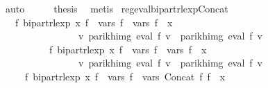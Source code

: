 \begin{isabellebody}
\ auto\isanewline
\ \ \isamarkupfalse%
\ \isamarkupfalse%
\ {\isacharquery}{\kern0pt}thesis\ \isamarkupfalse%
\ metis\isanewline
{}\isamarkupfalse%
%
\endisatagproof
{\isafoldproof}%
%
\isadelimproof
\isanewline
%
\endisadelimproof
\isanewline
{}\isamarkupfalse%
\ reg{\isacharunderscore}{\kern0pt}eval{\isacharunderscore}{\kern0pt}bipart{\isacharunderscore}{\kern0pt}rlexp{\isacharunderscore}{\kern0pt}Concat{\isacharcolon}{\kern0pt}\isanewline
\ \ \ {\isachardoublequoteopen}{\isasymexists}f{\isacharprime}{\kern0pt}{\isachardot}{\kern0pt}\ bipart{\isacharunderscore}{\kern0pt}rlexp\ x\ f{\isacharprime}{\kern0pt}\ {\isasymand}\ vars\ f{\isacharprime}{\kern0pt}\ {\isacharequal}{\kern0pt}\ vars\ f{}\ {\isasymunion}\ {\isacharbraceleft}{\kern0pt}x{\isacharbraceright}{\kern0pt}\ {\isasymand}\isanewline
\ \ \ \ \ \ \ \ \ \ \ \ \ \ \ \ {\isacharparenleft}{\kern0pt}{\isasymforall}v{\isachardot}{\kern0pt}\ parikh{\isacharunderscore}{\kern0pt}img\ {\isacharparenleft}{\kern0pt}eval\ f{}\ v{\isacharparenright}{\kern0pt}\ {\isacharequal}{\kern0pt}\ parikh{\isacharunderscore}{\kern0pt}img\ {\isacharparenleft}{\kern0pt}eval\ f{\isacharprime}{\kern0pt}\ v{\isacharparenright}{\kern0pt}{\isacharparenright}{\kern0pt}{\isachardoublequoteclose}\isanewline
\ \ \ \ \ \ \ \ \ \ {\isachardoublequoteopen}{\isasymexists}f{\isacharprime}{\kern0pt}{\isachardot}{\kern0pt}\ bipart{\isacharunderscore}{\kern0pt}rlexp\ x\ f{\isacharprime}{\kern0pt}\ {\isasymand}\ vars\ f{\isacharprime}{\kern0pt}\ {\isacharequal}{\kern0pt}\ vars\ f{}\ {\isasymunion}\ {\isacharbraceleft}{\kern0pt}x{\isacharbraceright}{\kern0pt}\ {\isasymand}\isanewline
\ \ \ \ \ \ \ \ \ \ \ \ \ \ \ \ {\isacharparenleft}{\kern0pt}{\isasymforall}v{\isachardot}{\kern0pt}\ parikh{\isacharunderscore}{\kern0pt}img\ {\isacharparenleft}{\kern0pt}eval\ f{}\ v{\isacharparenright}{\kern0pt}\ {\isacharequal}{\kern0pt}\ parikh{\isacharunderscore}{\kern0pt}img\ {\isacharparenleft}{\kern0pt}eval\ f{\isacharprime}{\kern0pt}\ v{\isacharparenright}{\kern0pt}{\isacharparenright}{\kern0pt}{\isachardoublequoteclose}\isanewline
\ \ \ \ \ {\isachardoublequoteopen}{\isasymexists}f{\isacharprime}{\kern0pt}{\isachardot}{\kern0pt}\ bipart{\isacharunderscore}{\kern0pt}rlexp\ x\ f{\isacharprime}{\kern0pt}\ {\isasymand}\ vars\ f{\isacharprime}{\kern0pt}\ {\isacharequal}{\kern0pt}\ vars\ {\isacharparenleft}{\kern0pt}Concat\ f{}\ f{}{\isacharparenright}{\kern0pt}\ {\isasymunion}\ {\isacharbraceleft}{\kern0pt}x{\isacharbraceright}{\kern0pt}\ {\isasymand}\isanewline

\end{isabellebody}
